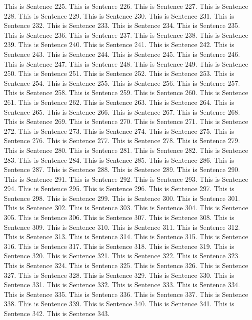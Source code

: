 \documentclass{article}
\begin{document}
This is Sentence 225.
This is Sentence 226.
This is Sentence 227.
This is Sentence 228.
This is Sentence 229.
This is Sentence 230.
This is Sentence 231.
This is Sentence 232.
This is Sentence 233.
This is Sentence 234.
This is Sentence 235.
This is Sentence 236.
This is Sentence 237.
This is Sentence 238.
This is Sentence 239.
This is Sentence 240.
This is Sentence 241.
This is Sentence 242.
This is Sentence 243.
This is Sentence 244.
This is Sentence 245.
This is Sentence 246.
This is Sentence 247.
This is Sentence 248.
This is Sentence 249.
This is Sentence 250.
This is Sentence 251.
This is Sentence 252.
This is Sentence 253.
This is Sentence 254.
This is Sentence 255.
This is Sentence 256.
This is Sentence 257.
This is Sentence 258.
This is Sentence 259.
This is Sentence 260.
This is Sentence 261.
This is Sentence 262.
This is Sentence 263.
This is Sentence 264.
This is Sentence 265.
This is Sentence 266.
This is Sentence 267.
This is Sentence 268.
This is Sentence 269.
This is Sentence 270.
This is Sentence 271.
This is Sentence 272.
This is Sentence 273.
This is Sentence 274.
This is Sentence 275.
This is Sentence 276.
This is Sentence 277.
This is Sentence 278.
This is Sentence 279.
This is Sentence 280.
This is Sentence 281.
This is Sentence 282.
This is Sentence 283.
This is Sentence 284.
This is Sentence 285.
This is Sentence 286.
This is Sentence 287.
This is Sentence 288.
This is Sentence 289.
This is Sentence 290.
This is Sentence 291.
This is Sentence 292.
This is Sentence 293.
This is Sentence 294.
This is Sentence 295.
This is Sentence 296.
This is Sentence 297.
This is Sentence 298.
This is Sentence 299.
This is Sentence 300.
This is Sentence 301.
This is Sentence 302.
This is Sentence 303.
This is Sentence 304.
This is Sentence 305.
This is Sentence 306.
This is Sentence 307.
This is Sentence 308.
This is Sentence 309.
This is Sentence 310.
This is Sentence 311.
This is Sentence 312.
This is Sentence 313.
This is Sentence 314.
This is Sentence 315.
This is Sentence 316.
This is Sentence 317.
This is Sentence 318.
This is Sentence 319.
This is Sentence 320.
This is Sentence 321.
This is Sentence 322.
This is Sentence 323.
This is Sentence 324.
This is Sentence 325.
This is Sentence 326.
This is Sentence 327.
This is Sentence 328.
This is Sentence 329.
This is Sentence 330.
This is Sentence 331.
This is Sentence 332.
This is Sentence 333.
This is Sentence 334.
This is Sentence 335.
This is Sentence 336.
This is Sentence 337.
This is Sentence 338.
This is Sentence 339.
This is Sentence 340.
This is Sentence 341.
This is Sentence 342.
This is Sentence 343.
\end{document}
